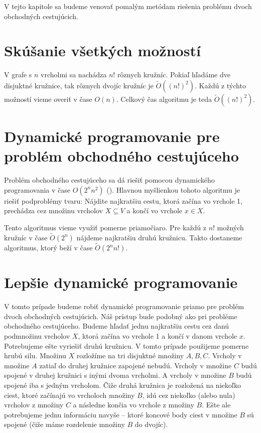 V tejto kapitole sa budeme venovať pomalým metódam riešenia problému
dvoch obchodných cestujúcich.

\section{Skúšanie všetkých možností}

V grafe s $n$ vrcholmi sa nachádza $n!$ rôznych kružníc. Pokiaľ hľadáme
dve disjuktné kružnice, tak rôznych dvojíc kružníc je $\tilde{O}((n!)^2)$.
Každú z týchto možností vieme overiť v čase $O(n)$. Celkový čas algoritmu
je teda $\tilde{O}((n!)^2)$.

\section{Dynamické programovanie pre problém obchodného cestujúceho}

Problém obchodného cestujúceho sa dá riešiť pomocou dynamického
programovania v čase $O(2^n n^2)$ (\cite{Held}). Hlavnou myšlienkou
tohoto algoritmu je riešiť podproblémy tvaru: Nájdite najkratšiu cestu, ktorá
začína vo vrchole 1, prechádza cez množinu vrcholov $X \subseteq V$ a končí vo vrchole
$x \in X$.

Tento algoritmus vieme využiť pomerne priamočiaro. Pre každú z $n!$ možných kružníc
v čase $\tilde{O}(2^n)$ nájdeme najkratšiu druhú kružnicu. Takto dostaneme
algoritmus, ktorý beží v čase $\tilde{O}(2^n n!)$. 

\section{Lepšie dynamické programovanie}

V tomto prípade budeme robiť dynamické programovanie priamo pre problém
dvoch obchodných cestujúcich. Náš prístup bude podobný ako pri probléme
obchodného cestujúceho. 
Budeme hľadať jednu najkratšiu cestu cez danú podmnožinu vrcholov
$X$, ktorá začína vo vrchole 1 a končí v danom vrchole $x$. Potrebujeme ešte vyriešiť
druhú kružnicu. V tomto prípade použijeme pomerne hrubú silu.
Množinu $X$ rozložíme na tri disjuktné množiny $A, B, C$.
Vrcholy v množine $A$ zatiaľ do druhej kružnice zapojené nebudú. Vrcholy v množine
$C$ budú spojené v druhej kružnici s inými dvoma vrcholmi.
A vrcholy v množine $B$ budú spojené iba s jedným vrcholom. Čiže druhá kružnica je
rozložená na niekoľko ciest, ktoré začínajú vo vrcholoch množiny $B$, idú cez niekoľko
(alebo nula) vrcholov z množiny $C$ a následne končia vo vrchole z množiny $B$.
Ešte ale potrebujeme jednu informáciu navyše -- ktoré koncové body ciest v množine
$B$ sú spojené (čiže máme rozdelenie množiny $B$ do dvojíc).

